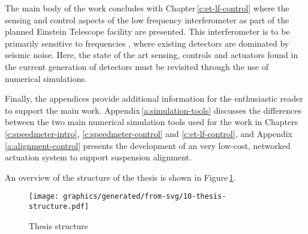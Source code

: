 The main body of the work concludes with Chapter\,\ref{c:et-lf-control} where the sensing and control aspects of the low frequency interferometer as part of the planned Einstein Telescope facility are presented. This interferometer is to be primarily sensitive to frequencies , where existing detectors are dominated by seismic noise. Here, the state of the art sensing, controls and actuators found in the current generation of detectors must be revisited through the use of numerical simulations.

Finally, the appendices provide additional information for the enthusiastic reader to support the main work. Appendix\,\ref{a:simulation-tools} discusses the differences between the two main numerical simulation tools used for the work in Chapters \ref{c:speedmeter-intro}, \ref{c:speedmeter-control} and \ref{c:et-lf-control}, and Appendix\,\ref{a:alignment-control} presents the development of an very low-cost, networked actuation system to support suspension alignment.

An overview of the structure of the thesis is shown in Figure\,\ref{fig:thesis-structure}.

\begin{figure}
  \centering
  \texttt{[image: graphics/generated/from-svg/10-thesis-structure.pdf]}
  \caption[Thesis structure]{\label{fig:thesis-structure}Thesis structure }
\end{figure}